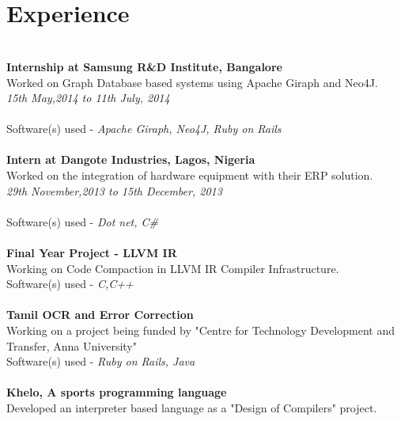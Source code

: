 \documentclass[margin,line]{resume}
\begin{document}
\begin{resume}
    \\\\\section{\mysidestyle Experience}

   
    \\\textbf{Internship at Samsung R\&D Institute, Bangalore} \\ Worked on Graph Database based systems using Apache Giraph and Neo4J.\\
\textsl{15th May,2014 to 11th July, 2014 }\\
  \\  Software(s) used -  \textsl{Apache Giraph, Neo4J, Ruby on Rails}\\
    \\\textbf{Intern at Dangote Industries, Lagos, Nigeria} \\Worked on the integration of hardware equipment with their ERP solution.\\
\textsl{29th November,2013 to 15th December, 2013 }\\
\\    Software(s) used -  \textsl{Dot net, C#}\\
    \\\textbf{Final Year Project - LLVM IR} \\Working on Code Compaction in LLVM IR Compiler Infrastructure. \vspace{2mm}\\\vspace{1mm}%
    Software(s) used -  \textsl{C,C++}\\
    \\\textbf{Tamil OCR and Error Correction} \\Working on a project being funded by "Centre for Technology Development and Transfer, Anna University" \vspace{2mm}\\\vspace{1mm}%
    Software(s) used -  \textsl{Ruby on Rails, Java}\\
    \\\textbf{Khelo, A sports programming language} \\Developed an interpreter based language as a "Design of Compilers" project. \vspace{2mm}\\\vspace{1mm}%

\end{resume}
\end{document}
